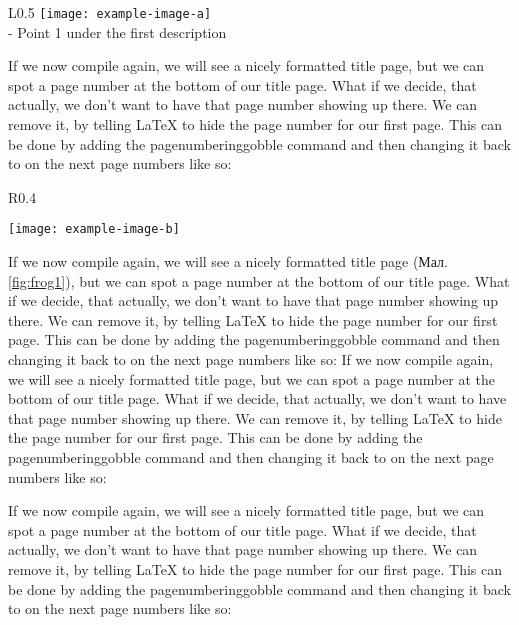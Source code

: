 \begin{wrapfigure}{L}{0.5\textwidth}
	\raggedleft %
	\texttt{[image: example-image-a]}\\
	\noindent
	- Point 1 under the first description\\
	\caption{\label{fig:frog1} Підпис до рисунку.}
\end{wrapfigure} 
If we now compile again, we will see a nicely formatted title page, but we can spot a page number at the bottom of our title page. What if we decide, that actually, we don’t want to have that page number showing up there. We can remove it, by telling LaTeX to hide the page number for our first page. This can be done by adding the pagenumbering{gobble} command and then changing it back to  on the next page numbers like so:

\begin{wrapfigure}{R}{0.4\textwidth}
	\raggedright
	\texttt{[image: example-image-b]}\\
	\caption{\label{fig:frog2} Підпис до рисунку.}
\end{wrapfigure}
If we now compile again, we will see a nicely formatted title page (Мал. \ref{fig:frog1}), but we can spot a page number at the bottom of our title page. What if we decide, that actually, we don’t want to have that page number showing up there. We can remove it, by telling LaTeX to hide the page number for our first page. This can be done by adding the pagenumbering{gobble} command and then changing it back to  on the next page numbers like so:
If we now compile again, we will see a nicely formatted title page, but we can spot a page number at the bottom of our title page. What if we decide, that actually, we don’t want to have that page number showing up there. We can remove it, by telling LaTeX to hide the page number for our first page. This can be done by adding the pagenumbering{gobble} command and then changing it back to  on the next page numbers like so:


If we now compile again, we will see a nicely formatted title page, but we can spot a page number at the bottom of our title page. What if we decide, that actually, we don’t want to have that page number showing up there. We can remove it, by telling LaTeX to hide the page number for our first page. This can be done by adding the pagenumbering{gobble} command and then changing it back to  on the next page numbers like so:
